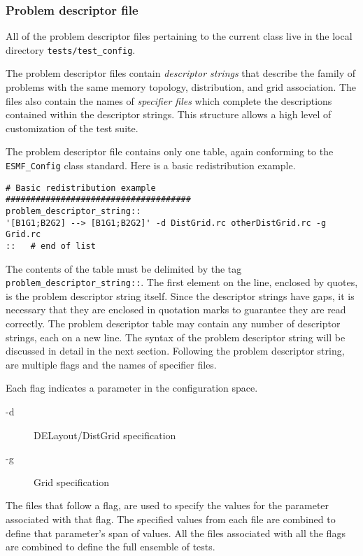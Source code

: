 \subsubsection{Problem descriptor file}
All of the problem descriptor files pertaining to the current class live in the local directory \texttt{tests/test\_config}.

The problem descriptor files contain \textit{descriptor strings} that describe the family of problems with the same memory topology, distribution, and grid association. The files also contain the names of \textit{specifier files} which complete the descriptions contained within the descriptor strings. This structure allows a high level of customization of the test suite.

The problem descriptor file contains only one table, again conforming to the \texttt{ESMF\_Config} class standard. Here is a basic redistribution example.
\begin{verbatim}
# Basic redistribution example
#####################################
problem_descriptor_string::
'[B1G1;B2G2] --> [B1G1;B2G2]' -d DistGrid.rc otherDistGrid.rc -g Grid.rc    
::   # end of list
\end{verbatim}

The contents of the table must be delimited by the tag \texttt{problem\_descriptor\_string::}. The first element on the line, enclosed by quotes, is the problem descriptor string itself. Since the descriptor strings have gaps, it is necessary that they are enclosed in quotation marks to guarantee they are read correctly. The problem descriptor table may contain any number of descriptor strings, each on a new line. The syntax of the problem descriptor string will be discussed in detail in the next section. Following the problem descriptor string, are multiple flags and the names of specifier files. 

Each flag indicates a parameter in the configuration space. 
\begin{description}
       \item [-d] DELayout/DistGrid specification
       \item [-g] Grid specification
\end{description}
The files that follow a flag, are used to specify the values for the parameter associated with that flag. The specified values from each file are combined to define that parameter's span of values.  All the files associated with all the flags are combined to define the full ensemble of tests.
 
